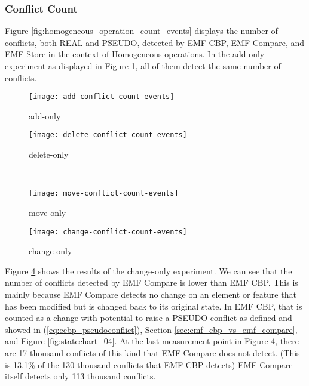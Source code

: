 \subsubsection{Conflict Count}
\label{sec:conflict_count}
Figure \ref{fig:homogeneous_operation_count_events} displays the number of conflicts, both \textsf{REAL} and \textsf{PSEUDO}, detected by EMF CBP, EMF Compare, and EMF Store in the context of Homogeneous operations. In the add-only experiment as displayed in Figure \ref{fig:add-conflict-count-events}, all of them detect the same number of conflicts.

\begin{figure*}[ht]
  \centering
  \begin{subfigure}[t]{0.490\linewidth}
    \texttt{[image: add-conflict-count-events]}
    \caption{add-only}
    \label{fig:add-conflict-count-events}
  \end{subfigure}
  \hfill
  \begin{subfigure}[t]{0.490\linewidth}
    \texttt{[image: delete-conflict-count-events]}
    \caption{delete-only}
    \label{fig:delete-conflict-count-events}
  \end{subfigure}
  \\
  \begin{subfigure}[t]{0.490\linewidth}
    \texttt{[image: move-conflict-count-events]}
    \caption{move-only}
    \label{fig:move-conflict-count-events}
  \end{subfigure}
  \hfill
  \begin{subfigure}[t]{0.490\linewidth}
    \texttt{[image: change-conflict-count-events]}
    \caption{change-only}
    \label{fig:change-conflict-count-events}
  \end{subfigure}
  \caption{Conflict detection count for homogeneous operations.}
  \label{fig:homogeneous_operation_count_events}
\end{figure*}

Figure \ref{fig:change-conflict-count-events} shows the results of the change-only experiment. We can see that the number of conflicts detected by EMF Compare is lower than EMF CBP. This is mainly because EMF Compare detects no change on an element or feature that has been modified but is changed back to its original state. In EMF CBP, that is counted as a change with potential to raise a {PSEUDO} conflict as defined and showed in (\ref{eq:ecbp_pseudoconflict}), Section \ref{sec:emf_cbp_vs_emf_compare}, and Figure \ref{fig:statechart_04}. At the last measurement point in Figure \ref{fig:change-conflict-count-events}, there are 17 thousand conflicts of this kind that EMF Compare does not detect. (This is 13.1\% of the 130 thousand conflicts that EMF CBP detects) EMF Compare itself detects only 113 thousand conflicts.

